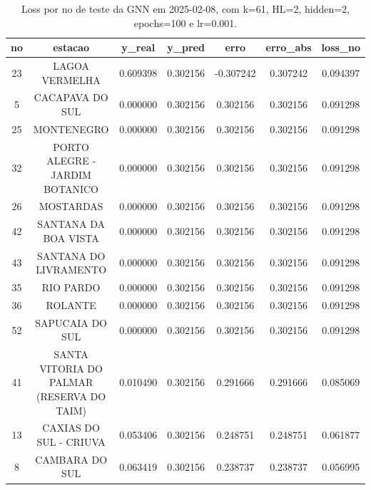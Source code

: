 \begin{table}[h]
\centering
\caption{Loss por no de teste da GNN em 2025-02-08, com k=61, HL=2, hidden=2, epochs=100 e lr=0.001.}
\label{tab:gnn_loss_k61_hl2_h2_e100_d20250208}
\begin{tabular}{ccccccc}
\toprule
no & estacao & y\_real & y\_pred & erro & erro\_abs & loss\_no \\
\midrule
23 & LAGOA VERMELHA & 0.609398 & 0.302156 & -0.307242 & 0.307242 & 0.094397 \\
5 & CACAPAVA DO SUL & 0.000000 & 0.302156 & 0.302156 & 0.302156 & 0.091298 \\
25 & MONTENEGRO & 0.000000 & 0.302156 & 0.302156 & 0.302156 & 0.091298 \\
32 & PORTO ALEGRE - JARDIM BOTANICO & 0.000000 & 0.302156 & 0.302156 & 0.302156 & 0.091298 \\
26 & MOSTARDAS & 0.000000 & 0.302156 & 0.302156 & 0.302156 & 0.091298 \\
42 & SANTANA DA BOA VISTA & 0.000000 & 0.302156 & 0.302156 & 0.302156 & 0.091298 \\
43 & SANTANA DO LIVRAMENTO & 0.000000 & 0.302156 & 0.302156 & 0.302156 & 0.091298 \\
35 & RIO PARDO & 0.000000 & 0.302156 & 0.302156 & 0.302156 & 0.091298 \\
36 & ROLANTE & 0.000000 & 0.302156 & 0.302156 & 0.302156 & 0.091298 \\
52 & SAPUCAIA DO SUL & 0.000000 & 0.302156 & 0.302156 & 0.302156 & 0.091298 \\
41 & SANTA VITORIA DO PALMAR (RESERVA DO TAIM) & 0.010490 & 0.302156 & 0.291666 & 0.291666 & 0.085069 \\
13 & CAXIAS DO SUL - CRIUVA & 0.053406 & 0.302156 & 0.248751 & 0.248751 & 0.061877 \\
8 & CAMBARA DO SUL & 0.063419 & 0.302156 & 0.238737 & 0.238737 & 0.056995 \\
\bottomrule
\end{tabular}
\end{table}
